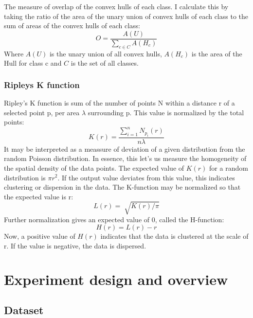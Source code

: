 \documentclass[11pt]{article}
\begin{document}
The measure of overlap of the convex hulls of each class. I calculate this by taking the ratio of the area of the unary union of convex hulls of each class to the sum of areas of the convex hulls of each class:
\[ O = \frac{A(U)}{\sum_{c \in C}A(H_{c})} \]
Where \(A(U)\) is the unary union of all convex hulls, \(A(H_{c})\) is the area of the Hull for class c and \(C\) is the set of all classes.
\subsubsection{Ripleys K function}
\label{sec:org60e8408}

Ripley's K function is sum of the number of points N within a distance r of a selected point p, per area \(\lambda\) surrounding p. This  value is normalized by the total points:
\[K(r) = \frac{\sum_{i=1}^{n}N_{p_{i}}(r)}{n \lambda}\]
It may be interpreted as a meassure of deviation of a given distribution from the random Poisson distribution. In essence, this let's us measure the homogeneity of the spatial density of the data points. The expected value of \(K(r)\) for a random distribution is \(\pi r^{2}\). If the output value deviates from this value, this indicates clustering or dispersion in the data. The K-function may be normalized so that the expected value is r:
\[L(r) = \sqrt[]{K(r)/\pi}\]
Further normalization gives an expected value of 0, called the H-function:
\[H(r) = L(r) - r\]
Now, a positive value of \(H(r)\) indicates that the data is clustered at the scale of r. If the value is negative, the data is dispersed.

\section{Experiment design and overview}
\label{sec:org6dac68a}
\subsection{Dataset}
\label{sec:orgc80f6f4}
\end{document}
